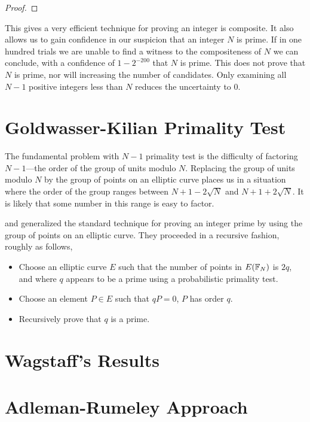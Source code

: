 \begin{proof}
\end{proof}

This gives a very efficient technique for proving an integer is
composite.  It also allows us to gain confidence in our suspicion that
an integer $N$ is prime.  If in one hundred trials we are unable to find
a witness to the compositeness of $N$ we can conclude, with a confidence
of $1 - 2^{-200}$ that $N$ is prime.  This does not prove that $N$ is
prime, nor will increasing the number of candidates.  Only examining all
$N-1$ positive integers less than $N$ reduces the uncertainty to $0$.  

\section{Goldwasser-Kilian Primality Test}

The fundamental problem with $N-1$ primality test is the difficulty of
factoring $N-1$---the order of the group of units modulo $N$.
Replacing the group of units modulo $N$ by the group of points on an
elliptic curve places us in a situation where the order of the group
ranges between $N+1 -2\sqrt{N}$ and $N+1+2\sqrt{N}$.  It is likely
that some number in this range is easy to factor.

{\Goldwasser} and {\Kilian} \cite{Goldwasser:Killian} generalized the
standard technique for proving an integer prime by using the group of
points on an elliptic curve.  They proceeded in a recursive fashion,
roughly as follows, 
\begin{itemize}
\item Choose an elliptic curve $E$ such that the number of points in
$E(\mathbb{F}_N)$ is $2q$, and where $q$ appears to be a prime using a
probabilistic primality test.
\item Choose an element  $P \in E$ such that $qP = 0$, \ie $P$ has
order $q$.
\item Recursively prove that $q$ is a prime.
\end{itemize}


\section{Wagstaff's Results}

\section{Adleman-Rumeley Approach}
